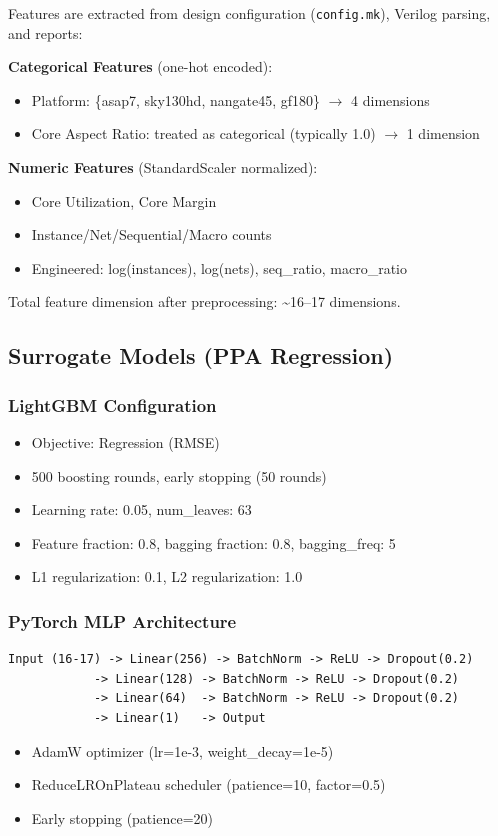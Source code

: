 \documentclass[10pt,conference]{IEEEtran}
\newcommand{\ORFS}{\text{ORFS}}
\begin{document}
Features are extracted from design configuration (\texttt{config.mk}), Verilog parsing, and \ORFS{} reports:

\textbf{Categorical Features} (one-hot encoded):
\begin{itemize}
    \item Platform: \{asap7, sky130hd, nangate45, gf180\} $\rightarrow$ 4 dimensions
    \item Core Aspect Ratio: treated as categorical (typically 1.0) $\rightarrow$ 1 dimension
\end{itemize}

\textbf{Numeric Features} (StandardScaler normalized):
\begin{itemize}
    \item Core Utilization, Core Margin
    \item Instance/Net/Sequential/Macro counts
    \item Engineered: log(instances), log(nets), seq\_ratio, macro\_ratio
\end{itemize}

Total feature dimension after preprocessing: \textasciitilde 16--17 dimensions.

\subsection{Surrogate Models (PPA Regression)}
\label{sec:surrogate_models}

\subsubsection{LightGBM Configuration}
\begin{itemize}
    \item Objective: Regression (RMSE)
    \item 500 boosting rounds, early stopping (50 rounds)
    \item Learning rate: 0.05, num\_leaves: 63
    \item Feature fraction: 0.8, bagging fraction: 0.8, bagging\_freq: 5
    \item L1 regularization: 0.1, L2 regularization: 1.0
\end{itemize}

\subsubsection{PyTorch MLP Architecture}
\begin{verbatim}
Input (16-17) -> Linear(256) -> BatchNorm -> ReLU -> Dropout(0.2)
            -> Linear(128) -> BatchNorm -> ReLU -> Dropout(0.2)
            -> Linear(64)  -> BatchNorm -> ReLU -> Dropout(0.2)
            -> Linear(1)   -> Output
\end{verbatim}
\begin{itemize}
    \item AdamW optimizer (lr=1e-3, weight\_decay=1e-5)
    \item ReduceLROnPlateau scheduler (patience=10, factor=0.5)
    \item Early stopping (patience=20)
\end{itemize}
\end{document}
